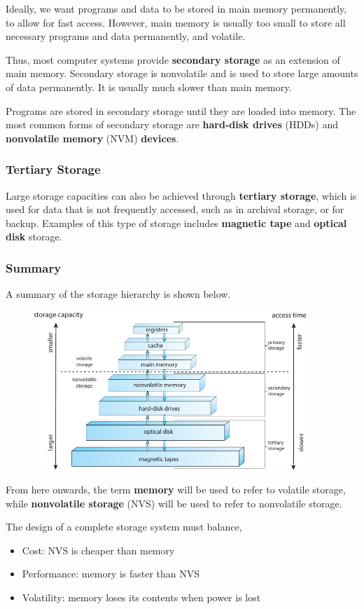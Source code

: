 \documentclass{article}
\begin{document}
Ideally, we want programs and data to be stored in main memory permanently, to allow
for fast access. However, main memory is usually too small to store all necessary
programs and data permanently, and volatile.

Thus, most computer systems provide \textbf{secondary storage} as an extension of
main memory. Secondary storage is nonvolatile and is used to store large amounts
of data permanently. It is usually much slower than main memory.

Programs are stored in secondary storage until they are loaded into memory.
The most common forms of secondary storage are \textbf{hard-disk drives} (HDDs) and
\textbf{nonvolatile memory} (NVM) \textbf{devices}.
\subsubsection{Tertiary Storage}
Large storage capacities can also be achieved through \textbf{tertiary storage}, which
is used for data that is not frequently accessed, such as in archival storage, or
for backup. Examples of this type of storage includes \textbf{magnetic tape} and \textbf{optical disk} storage.
\subsubsection{Summary}
A summary of the storage hierarchy is shown below.
\begin{figure}[H]
    \centering
    \includegraphics[height = 6cm]{figures/storage_hierarchy.pdf}
\end{figure}
From here onwards, the term \textbf{memory} will be used to refer to volatile storage,
while \textbf{nonvolatile storage} (NVS) will be used to refer to nonvolatile storage.

The design of a complete storage system must balance,
\begin{itemize}
    \item Cost: NVS is cheaper than memory
    \item Performance: memory is faster than NVS
    \item Volatility: memory loses its contents when power is lost
\end{itemize}
\end{document}
